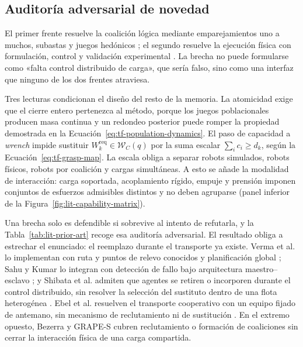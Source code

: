 \subsection{Auditoría adversarial de novedad}
\label{app:review-redteam-full}

El primer frente resuelve la coalición lógica mediante emparejamientos uno a
muchos, subastas y juegos hedónicos
\parencite{choiBrunetHow2009CBBA,serviceAdams2011Coalition,chenSun2012Coalition,jangShinTsourdos2018GRAPE,duttaAsaithambi2019Bipartite,dutta2021hedonic,diehlAdams2026Grapes};
el segundo resuelve la ejecución física con formulación, control y validación
experimental
\parencite{alonsomora2017transport,shibata2023event,ebel2024cooperative,fukao2025swarm,tian2025irregular,muhammed2026decentralizedMpc}.
La brecha no puede formularse como «falta control distribuido de carga», que
sería falso, sino como una interfaz que ninguno de los dos frentes atraviesa.

Tres lecturas condicionan el diseño del resto de la memoria. La atomicidad
exige que el cierre entero pertenezca al método, porque los juegos
poblacionales producen masa continua y un redondeo posterior puede romper la
propiedad demostrada en la Ecuación~\eqref{eq:tf-population-dynamics}. El paso
de capacidad a \emph{wrench} impide sustituir
$W_k^{\mathrm{req}} \in \mathcal W_C(q)$ por la suma escalar
$\sum_i c_i \ge d_k$, según la Ecuación~\eqref{eq:tf-grasp-map}. La escala
obliga a separar robots simulados, robots físicos, robots por coalición y
cargas simultáneas. A esto se añade la modalidad de interacción: carga
soportada, acoplamiento rígido, empuje y prensión imponen conjuntos de
esfuerzos admisibles distintos y no deben agruparse (panel inferior de la
Figura~\ref{fig:lit-capability-matrix}).



Una brecha solo es defendible si sobrevive al intento de refutarla, y la
Tabla~\ref{tab:lit-prior-art} recoge esa auditoría adversarial. El resultado
obliga a estrechar el enunciado: el reemplazo durante el transporte ya existe.
Verma et al. lo implementan con ruta y puntos de relevo conocidos y
planificación global \parencite{verma2019replacement}; Sahu y Kumar lo
integran con detección de fallo bajo arquitectura maestro--esclavo
\parencite{sahuKumar2026FaultManagement}; y Shibata et al. admiten que agentes
se retiren o incorporen durante el control distribuido, sin resolver la
selección del sustituto dentro de una flota heterogénea
\parencite{shibata2023event}. Ebel et al. resuelven el transporte cooperativo
con un equipo fijado de antemano, sin mecanismo de reclutamiento ni de
sustitución \parencite{ebel2024cooperative}. En el extremo opuesto, Bezerra y
GRAPE-S cubren reclutamiento o formación de coaliciones sin cerrar la
interacción física de una carga compartida.

